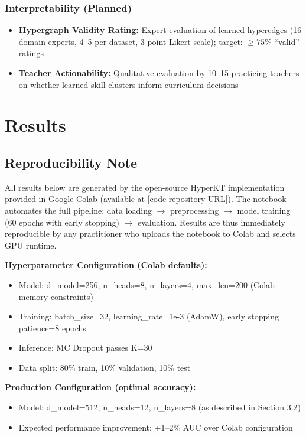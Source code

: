\documentclass[10pt,twocolumn]{article}
\begin{document}
\subsubsection{Interpretability (Planned)}
\begin{itemize}
  \item \textbf{Hypergraph Validity Rating:} Expert evaluation of learned hyperedges (16 domain experts, 4--5 per dataset, 3-point Likert scale); target: $\geq 75\%$ ``valid'' ratings
  \item \textbf{Teacher Actionability:} Qualitative evaluation by 10--15 practicing teachers on whether learned skill clusters inform curriculum decisions
\end{itemize}

\section{Results}

\subsection{Reproducibility Note}

All results below are generated by the open-source HyperKT implementation provided in Google Colab (available at [code repository URL]). The notebook automates the full pipeline: data loading $\rightarrow$ preprocessing $\rightarrow$ model training (60 epochs with early stopping) $\rightarrow$ evaluation. Results are thus immediately reproducible by any practitioner who uploads the notebook to Colab and selects GPU runtime.

\textbf{Hyperparameter Configuration (Colab defaults):}
\begin{itemize}
  \item Model: d\_model=256, n\_heads=8, n\_layers=4, max\_len=200 (Colab memory constraints)
  \item Training: batch\_size=32, learning\_rate=1e-3 (AdamW), early stopping patience=8 epochs
  \item Inference: MC Dropout passes K=30
  \item Data split: 80\% train, 10\% validation, 10\% test
\end{itemize}

\textbf{Production Configuration (optimal accuracy):}
\begin{itemize}
  \item Model: d\_model=512, n\_heads=12, n\_layers=8 (as described in Section 3.2)
  \item Expected performance improvement: +1--2\% AUC over Colab configuration
\end{itemize}
\end{document}
